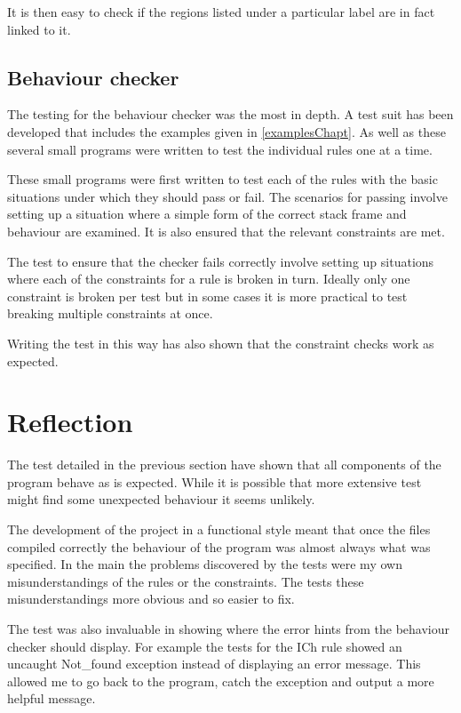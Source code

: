 It is then easy to check if the regions listed under a particular label are in fact linked to it. 

\subsection{Behaviour checker}

The testing for the behaviour checker was the most in depth. A test suit has been developed that includes the examples given in \ref{examplesChapt}. As well as these several small programs were written to test the individual rules one at a time. 

These small programs were first written to test each of the rules with the basic situations under which they should pass or fail. The scenarios for passing involve setting up a situation where a simple form of the correct stack frame and behaviour are examined. It is also ensured that the relevant constraints are met. 

The test to ensure that the checker fails correctly involve setting up situations where each of the constraints for a rule is broken in turn. Ideally only one constraint is broken per test but in some cases it is more practical to test breaking multiple constraints at once. 

Writing the test in this way has also shown that the constraint checks work as expected.

\section{Reflection}

The test detailed in the previous section have shown that all components of the program behave as is expected. While it is possible that more extensive test might find some unexpected behaviour it seems unlikely. 

The development of the project in a functional style meant that once the files compiled correctly the behaviour of the program was almost always what was specified. In the main the problems discovered by the tests were my own misunderstandings of the rules or the constraints. The tests these misunderstandings more obvious and so easier to fix. 

The test was also invaluable in showing where the error hints from the behaviour checker should display. For example the tests for the ICh rule showed an uncaught Not_found exception instead of displaying an error message. This allowed me to go back to the program, catch the exception and output a more helpful message. 

